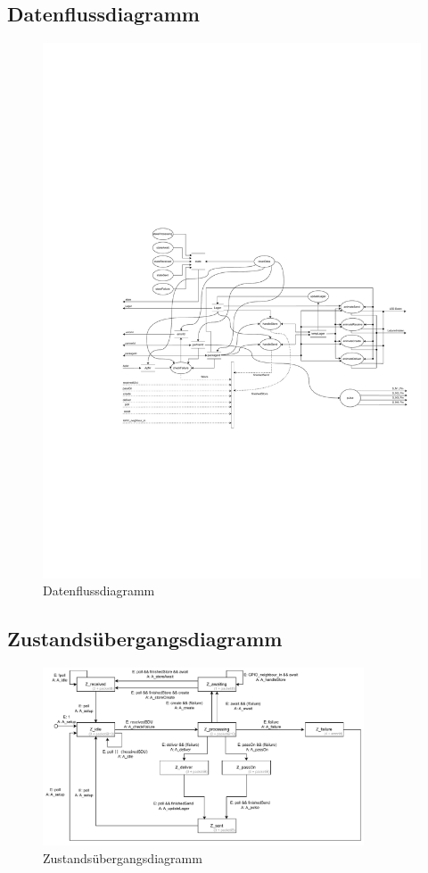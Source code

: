 \subsection{Datenflussdiagramm}
\begin{figure}[H]
    \centering
    \includegraphics[page=1,width=\textwidth]{pdfs/Datenflussdiagramm.pdf} 
    \caption{Datenflussdiagramm}
    \label{fig:Datenflussdiagramm}
\end{figure}

\subsection{Zustandsübergangsdiagramm}
\begin{figure}[H]
    \centering
    \includegraphics[page=1,width=0.85\textwidth]{pdfs/Zustandsuebergangsdiagramm.pdf} 
    \caption{Zustandsübergangsdiagramm}
    \label{fig:Zustandsuebergangsdiagramm}
\end{figure}

